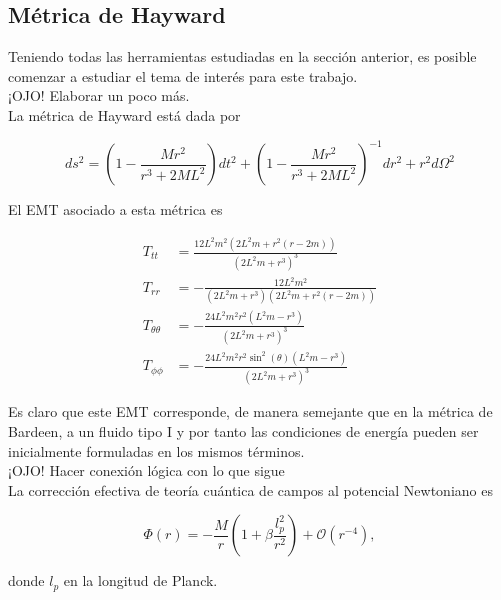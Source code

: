 \documentclass{article}
\numberwithin{equation}{section}
\begin{document}
\subsection{Métrica de Hayward}

Teniendo todas las herramientas estudiadas en la sección anterior, es posible comenzar a estudiar el tema de interés para este trabajo.\\

¡OJO! Elaborar un poco más.\\

La métrica de Hayward está dada por 

\begin{equation}
ds^2 = \left( 1 - \frac{Mr^2}{r^3 + 2ML^2} \right) dt^2 + \left( 1 - \frac{Mr^2}{r^3 + 2ML^2} \right)^{-1} dr^2 + r^2d\Omega ^2
\end{equation}

El EMT asociado a esta métrica es

\begin{equation}
\begin{split}
T_{tt} &= \frac{12 L^2 m^2 \left(2 L^2 m+r^2 (r-2 m)\right)}{\left(2 L^2 m+r^3\right)^3}\\
T_{rr} &= -\frac{12 L^2 m^2}{\left(2 L^2 m+r^3\right) \left(2 L^2 m+r^2 (r-2 m)\right)}\\
T_{\theta \theta} &= -\frac{24 L^2 m^2 r^2 \left(L^2 m-r^3\right)}{\left(2 L^2 m+r^3\right)^3}\\
T_{\phi \phi} &= -\frac{24 L^2 m^2 r^2 \sin ^2(\theta ) \left(L^2 m-r^3\right)}{\left(2 L^2 m+r^3\right)^3}
\end{split}
\end{equation}

Es claro que este EMT corresponde, de manera semejante que en la métrica de Bardeen, a un fluido tipo I y por tanto las condiciones de energía pueden ser inicialmente formuladas en los mismos términos.\\


¡OJO! Hacer conexión lógica con lo que sigue\\

La corrección efectiva de teoría cuántica de campos al potencial Newtoniano es

\begin{equation}
\label{newF}
\Phi (r) = -\frac{M}{r} \left( 1 + \beta \frac{l_{p}^2}{r^2} \right) + \mathcal{O}(r^{-4}),
\end{equation}

donde $l_{p}$ en la longitud de Planck.\\
\end{document}

